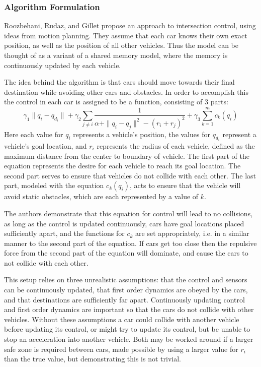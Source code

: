 \documentclass[12pt]{article}
\begin{document}
\subsubsection{Algorithm Formulation}
Roozbehani, Rudaz, and Gillet propose an approach to intersection control, using ideas from motion planning. They assume that each car knows their own exact position, as well as the position of all other vehicles. Thus the model can be thought of as a variant of a shared memory model, where the memory is continuously updated by each vehicle. \par
The idea behind the algorithm is that cars should move towards their final destination while avoiding other cars and obstacles. In order to accomplish this the control in each car is assigned to be a function, consisting of 3 parts:
\begin{equation}
\gamma_1\|q_i - q_{d_i}\| + \gamma_2\sum_{j \neq i} \frac{1}{\alpha + \|q_i - q_j\|^2 - (r_i + r_j)^2} + \gamma_3\sum_{k=1}^m c_k(q_i)
\end{equation}
Here each value for $q_i$ represents a vehicle's position, the values for $q_{d_i}$ represent a vehicle's goal location, and $r_i$ represents the radius of each vehicle, defined as the maximum distance from the center to boundary of vehicle. The first part of the equation represents the desire for each vehicle to reach its goal location. The second part serves to ensure that vehicles do not collide with each other. The last part, modeled with the equation $c_k(q_i)$, acts to ensure that the vehicle will avoid static obstacles, which are each represented by a value of $k$.\par
The authors demonstrate that this equation for control will lead to no collisions, as long as the control is updated continuously, cars have goal locations placed sufficiently apart, and the functions for $c_k$ are set appropriately, i.e. in a similar manner to the second part of the equation. If cars get too close then the repulsive force from the second part of the equation will dominate, and cause the cars to not collide with each other. \par
This setup relies on three unrealistic assumptions: that the control and sensors can be continuously updated, that first order dynamics are obeyed by the cars, and that destinations are sufficiently far apart. Continuously updating control and first order dynamics are important so that the cars do not collide with other vehicles. Without  these assumptions a car could collide with another vehicle before updating its control, or might try to update its control, but be unable to stop an acceleration into another vehicle. Both may be worked around if a larger safe zone is required between cars, made possible by using a larger value for $r_i$ than the true value, but demonstrating this is not trivial. \par
\end{document}
